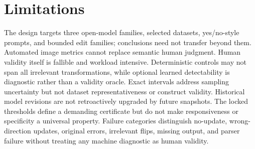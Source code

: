 \section{Limitations}
The design targets three open-model families, selected datasets, yes/no-style prompts, and bounded edit
families; conclusions need not transfer beyond them. Automated image metrics cannot replace semantic
human judgment. Human validity itself is fallible and workload intensive. Deterministic controls may
not span all irrelevant transformations, while optional learned detectability is diagnostic rather
than a validity oracle. Exact intervals address sampling uncertainty but not dataset representativeness
or construct validity. Historical model revisions are not retroactively upgraded by future snapshots.
The locked thresholds define a demanding certificate but do not make responsiveness or specificity a
universal property. Failure categories distinguish no-update, wrong-direction updates, original
errors, irrelevant flips, missing output, and parser failure without treating any machine diagnostic
as human validity.
